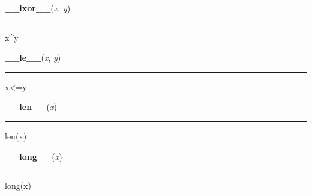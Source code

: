     \begin{boxedminipage}{\textwidth}

    \raggedright \textbf{\_\_ixor\_\_}(\textit{x}, \textit{y})

    \vspace{-1.5ex}

    \rule{\textwidth}{0.5\fboxrule}

x{\textasciicircum}y
    \vspace{1ex}

    \end{boxedminipage}

    \label{numpy:ndarray:__le__}

    \vspace{0.5ex}

    \begin{boxedminipage}{\textwidth}

    \raggedright \textbf{\_\_le\_\_}(\textit{x}, \textit{y})

    \vspace{-1.5ex}

    \rule{\textwidth}{0.5\fboxrule}

x{\textless}=y
    \vspace{1ex}

    \end{boxedminipage}

    \label{numpy:ndarray:__len__}

    \vspace{0.5ex}

    \begin{boxedminipage}{\textwidth}

    \raggedright \textbf{\_\_len\_\_}(\textit{x})

    \vspace{-1.5ex}

    \rule{\textwidth}{0.5\fboxrule}

len(x)
    \vspace{1ex}

    \end{boxedminipage}

    \label{numpy:ndarray:__long__}

    \vspace{0.5ex}

    \begin{boxedminipage}{\textwidth}

    \raggedright \textbf{\_\_long\_\_}(\textit{x})

    \vspace{-1.5ex}

    \rule{\textwidth}{0.5\fboxrule}

long(x)
    \vspace{1ex}

    \end{boxedminipage}

